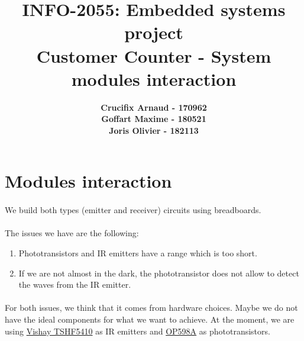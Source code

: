 \documentclass{article}
\begin{document}
\title{\Large{INFO-2055: Embedded systems project\\Customer Counter - System modules interaction}}
\vspace{1cm}
\author{\small{\bf Crucifix Arnaud - 170962} \\ \small{\bf Goffart Maxime - 180521} \\ \small{\bf Joris Olivier - 182113}}
\date{}

\maketitle


\section{Modules interaction}
\paragraph{}We build both types (emitter and receiver) circuits using breadboards.
\paragraph{}The issues we have are the following:
\begin{enumerate}
    \item Phototransistors and IR emitters have a range which is too short.
    \item If we are not almost in the dark, the phototransistor does not allow to detect the waves from the IR emitter.
\end{enumerate}
\paragraph{}For both issues, we think that it comes from hardware choices. Maybe we do not have the ideal components for what we want to achieve. At the moment, we are using \href{https://be.farnell.com/vishay/tshf5410/emetteur-infrarouge-890nm-t-1/dp/1652534?gclid=Cj0KCQjwrsGCBhD1ARIsALILBYrUKN4GryFp_Vp_vzQ5O_W0PcuBohulg6OxR3ZDBh-9AeUAS_I4SR0aAvQ2EALw_wcB&mckv=s0CeFi390_dc|pcrid|353465811553|kword|tshf5410|match|p|plid||slid||product||pgrid|12806565027|ptaid|kwd-5961707377|&CMP=KNC-GBE-GEN-FRE-SKU-G12-VISHAY-OPT}{Vishay TSHF5410} as IR emitters and \href{https://be.farnell.com/tt-electronics-optek-technology/op598a/phototransistor-plastic-to-18/dp/1497887?st=op598a}{OP598A} as phototransistors.
\end{document}
